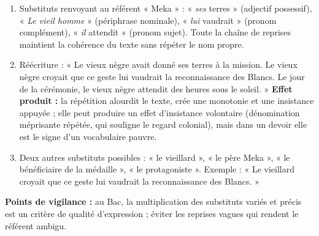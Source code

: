 \documentclass[11pt]{article}
\begin{document}
\begin{corrige}

\begin{enumerate}
\item Substituts renvoyant au référent « Meka » : « \emph{ses} terres » (adjectif possessif), « \emph{Le vieil homme} » (périphrase nominale), « \emph{lui} vaudrait » (pronom complément), « \emph{il} attendit » (pronom sujet). Toute la chaîne de reprises maintient la cohérence du texte sans répéter le nom propre.

\item Réécriture : « Le vieux nègre avait donné ses terres à la mission. Le vieux nègre croyait que ce geste lui vaudrait la reconnaissance des Blancs. Le jour de la cérémonie, le vieux nègre attendit des heures sous le soleil. » \textbf{Effet produit :} la répétition alourdit le texte, crée une monotonie et une insistance appuyée ; elle peut produire un effet d'insistance volontaire (dénomination méprisante répétée, qui souligne le regard colonial), mais dans un devoir elle est le signe d'un vocabulaire pauvre.

\item Deux autres substituts possibles : « le vieillard », « le père Meka », « le bénéficiaire de la médaille », « le protagoniste ». Exemple : « Le vieillard croyait que ce geste lui vaudrait la reconnaissance des Blancs. »
\end{enumerate}

\textbf{Points de vigilance :} au Bac, la multiplication des substituts variés et précis est un critère de qualité d'expression ; éviter les reprises vagues qui rendent le référent ambigu.
\end{corrige}
\end{document}
